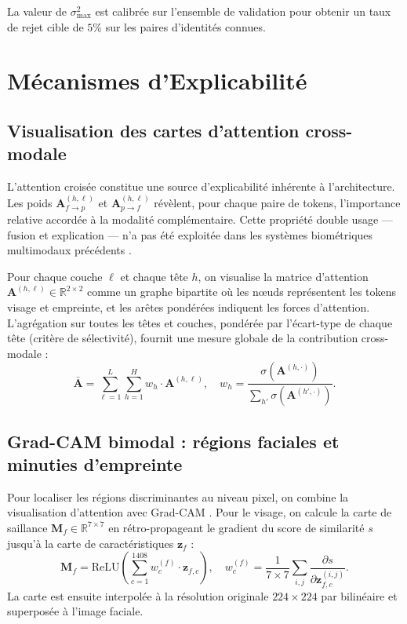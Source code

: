 \documentclass[12pt,a4paper]{report}
\begin{document}
La valeur de $\sigma^2_{\max}$ est calibr\'{e}e sur l'ensemble de validation pour obtenir un taux de rejet cible de $5\%$ sur les paires d'identit\'{e}s connues.

\section{M\'{e}canismes d'Explicabilit\'{e}}
\label{sec:explicabilite-ch2}

\subsection{Visualisation des cartes d'attention cross-modale}

L'attention crois\'{e}e constitue une source d'explicabilit\'{e} inh\'{e}rente \`{a} l'architecture. Les poids $\mathbf{A}_{f \rightarrow p}^{(h,\ell)}$ et $\mathbf{A}_{p \rightarrow f}^{(h,\ell)}$ r\'{e}v\`{e}lent, pour chaque paire de tokens, l'importance relative accord\'{e}e \`{a} la modalit\'{e} compl\'{e}mentaire. Cette propri\'{e}t\'{e} double usage --- fusion et explication --- n'a pas \'{e}t\'{e} exploit\'{e}e dans les syst\`{e}mes biom\'{e}triques multimodaux pr\'{e}c\'{e}dents \cite{selvarani2025explainability, yang2024authformer}.

Pour chaque couche $\ell$ et chaque t\^{e}te $h$, on visualise la matrice d'attention $\mathbf{A}^{(h,\ell)} \in \mathbb{R}^{2 \times 2}$ comme un graphe bipartite o\`{u} les n\oe uds repr\'{e}sentent les tokens visage et empreinte, et les ar\^{e}tes pond\'{e}r\'{e}es indiquent les forces d'attention. L'agr\'{e}gation sur toutes les t\^{e}tes et couches, pond\'{e}r\'{e}e par l'\'{e}cart-type de chaque t\^{e}te (crit\`{e}re de s\'{e}lectivit\'{e}), fournit une mesure globale de la contribution cross-modale :
\begin{equation}
\label{eq:attention-agregee}
\bar{\mathbf{A}} = \sum_{\ell=1}^{L} \sum_{h=1}^{H} w_h \cdot \mathbf{A}^{(h,\ell)}, \quad w_h = \frac{\sigma(\mathbf{A}^{(h,\cdot)})}{\sum_{h'} \sigma(\mathbf{A}^{(h',\cdot)})}.
\end{equation}

\subsection{Grad-CAM bimodal : r\'{e}gions faciales et minuties d'empreinte}

Pour localiser les r\'{e}gions discriminantes au niveau pixel, on combine la visualisation d'attention avec Grad-CAM \cite{selvaraju2017grad}. Pour le visage, on calcule la carte de saillance $\mathbf{M}_f \in \mathbb{R}^{7 \times 7}$ en r\'{e}tro-propageant le gradient du score de similarit\'{e} $s$ jusqu'\`{a} la carte de caract\'{e}ristiques $\mathbf{z}_f$ :
\begin{equation}
\mathbf{M}_f = \text{ReLU}\left( \sum_{c=1}^{1408} w_c^{(f)} \cdot \mathbf{z}_{f,c} \right), \quad w_c^{(f)} = \frac{1}{7 \times 7} \sum_{i,j} \frac{\partial s}{\partial \mathbf{z}_{f,c}^{(i,j)}}.
\end{equation}
La carte est ensuite interpol\'{e}e \`{a} la r\'{e}solution originale $224 \times 224$ par bilin\'{e}aire et superpos\'{e}e \`{a} l'image faciale.
\end{document}
